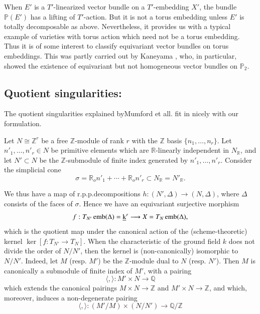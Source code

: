 \begin{remark*}
When $E'$ is a $T'$-linearized vector bundle on a $T'$-embedding
$X'$, the bundle $\mathbb{P}(E')$ has a lifting of $T'$-action. But it
is not a torus embedding unless $E'$ is totally decomposable as
above. Nevertheless, it provides us with a typical example of
varieties with torus action which need not be a torus embedding. Thus
it is of some interest to classify equivariant vector bundles on torus
embeddings. This was partly carried out by Kaneyama \cite{keyK1}, who, in
particular, showed the existence of equivariant but not homogeneous
vector bundles on $\mathbb{P}_{2}$. 
\end{remark*}


\subsection{Quotient singularities:}\label{chap1:subsec7.7}
 The quotient singularities explained by\break Mumford et
 all. \cite[p.16-19]{keyTE} fit in nicely with our formulation. 

Let $N \cong \mathbb{Z}^r$ be a free $\mathbb{Z}$-module of rank $r$
with the $\mathbb{Z}$ basis $\{n_1, \ldots, n_r\}$. Let $n'_1, \ldots ,
n'_r \in N$ be primitive elements which are $\mathbb{R}$-linearly
independent in $N_{\mathbb{R}}$, and let $N' \subset N$ be the
$\mathbb{Z}$-submodule of finite index generated by $n'_1, \ldots ,
n'_r$. Consider the simplicial cone  
$$
\sigma= \mathbb{R}_on'_1 + \cdots +\mathbb{R}_on'_r \subset
N_{\mathbb{R}}= N'_{\mathbb{R}}. 
$$

We thus have a map of r.p.p.decompositions $h: (N', \Delta) \to (N,
\Delta)$, where $\Delta$ consists of the faces of $\sigma$. Hence we
have an equivariant surjective morphism 
$$
f: T_{N'} \operatorname{emb} (\Delta)= \underbar{k}^r \longrightarrow X= T_N \operatorname{emb} (\Delta),
$$
which is the quotient map under the canonical action of the
(scheme-theoretic) kernel $\ker[f:T_{N'} \to T_N]$. When the
characteristic of the ground field $k$ does not divide the order of
$N/N'$, then the kernel is (non-canonically) isomorphic to
$N/N'$. Indeed, let $M$ (resp. $M'$) be the  $\mathbb{Z}$-module dual
to $N$ (resp. $N'$). Then $M$ is canonically a submodule of finite
index of $M'$, with a pairing  
$$
\langle ,\rangle:M' \times N \longrightarrow \mathbb{Q}
$$  
which extends the canonical pairings $M \times N \to \mathbb{Z}$ and
$M' \times N \to \mathbb{Z}$, and which, moreover, induces a
non-degenerate pairing   
$$
\langle,\rangle: (M'/M) \times (N/N') \longrightarrow \mathbb{Q}/
\mathbb{Z} 
$$

